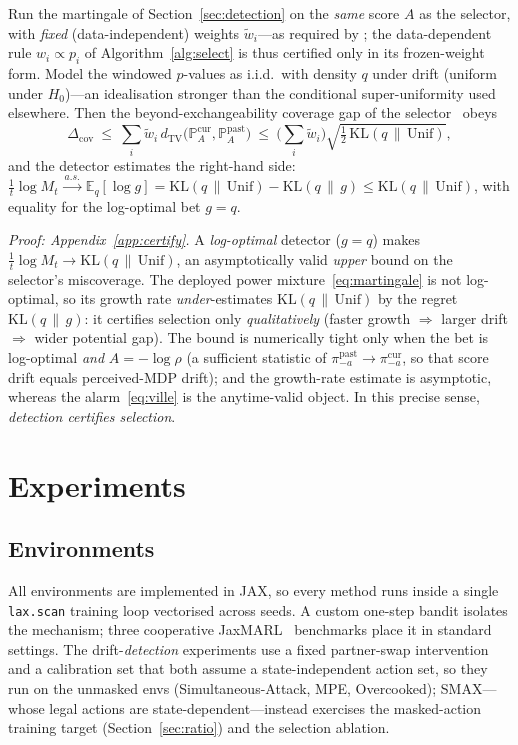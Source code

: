 \documentclass[sigconf]{aamas}
\newcommand{\picur}{\pi^{\mathrm{cur}}_{-a}}
\newcommand{\pipast}{\pi^{\mathrm{past}}_{-a}}
\newcommand{\KL}{\mathrm{KL}}
\newcommand{\dTV}{d_{\mathrm{TV}}}
\begin{document}
\begin{lemma}
\label{lem:certify}
Run the martingale of Section~\ref{sec:detection} on the \emph{same} score $A$ as
the selector, with \emph{fixed} (data-independent) weights $\tilde w_i$---as
required by \citet{barber2023beyond}; the data-dependent rule $w_i\propto p_i$ of
Algorithm~\ref{alg:select} is thus certified only in its frozen-weight form. Model
the windowed $p$-values as i.i.d.\ with density $q$ under drift (uniform under
$H_0$)---an idealisation stronger than the conditional super-uniformity used
elsewhere. Then the beyond-exchangeability coverage gap of the
selector~\citep{barber2023beyond} obeys
\[
\Delta_{\mathrm{cov}}\ \le\ \sum_i\tilde w_i\,
\dTV\!\big(\mathbb{P}^{\mathrm{cur}}_A,\mathbb{P}^{\mathrm{past}}_A\big)\ \le\
\Big(\textstyle\sum_i\tilde w_i\Big)\sqrt{\tfrac12\,\KL(q\,\|\,\mathrm{Unif})},
\]
and the detector estimates the right-hand side:
$\tfrac1t\log M_t\xrightarrow{\ a.s.\ }\mathbb{E}_q[\log g]
=\KL(q\,\|\,\mathrm{Unif})-\KL(q\,\|\,g)\le\KL(q\,\|\,\mathrm{Unif})$, with equality
for the log-optimal bet $g=q$.
\end{lemma}
\noindent\emph{Proof: Appendix~\ref{app:certify}.} A \emph{log-optimal} detector
($g=q$) makes $\tfrac1t\log M_t\to\KL(q\,\|\,\mathrm{Unif})$, an asymptotically
valid \emph{upper} bound on the selector's miscoverage. The deployed power
mixture~\eqref{eq:martingale} is not log-optimal, so its growth rate
\emph{under}-estimates $\KL(q\,\|\,\mathrm{Unif})$ by the regret $\KL(q\,\|\,g)$: it
certifies selection only \emph{qualitatively} (faster growth $\Rightarrow$ larger
drift $\Rightarrow$ wider potential gap). The bound is numerically tight only when
the bet is log-optimal \emph{and} $A=-\log\rho$ (a sufficient statistic of
$\pipast\!\to\!\picur$, so that score drift equals perceived-MDP drift); and the
growth-rate estimate is asymptotic, whereas the alarm~\eqref{eq:ville} is the
anytime-valid object. In this precise sense, \emph{detection certifies selection}.

\section{Experiments}
\label{sec:experiments}

\subsection{Environments}
\label{sec:envs}
All environments are implemented in JAX, so every method runs inside a single
\texttt{lax.scan} training loop vectorised across seeds. A custom one-step bandit
isolates the mechanism; three cooperative JaxMARL~\cite{rutherford2024jaxmarl}
benchmarks place it in standard settings. The drift-\emph{detection} experiments
use a fixed partner-swap intervention and a calibration set that both assume a
state-independent action set, so they run on the unmasked envs
(Simultaneous-Attack, MPE, Overcooked); SMAX---whose legal actions are
state-dependent---instead exercises the masked-action training target
(Section~\ref{sec:ratio}) and the selection ablation.
\end{document}

